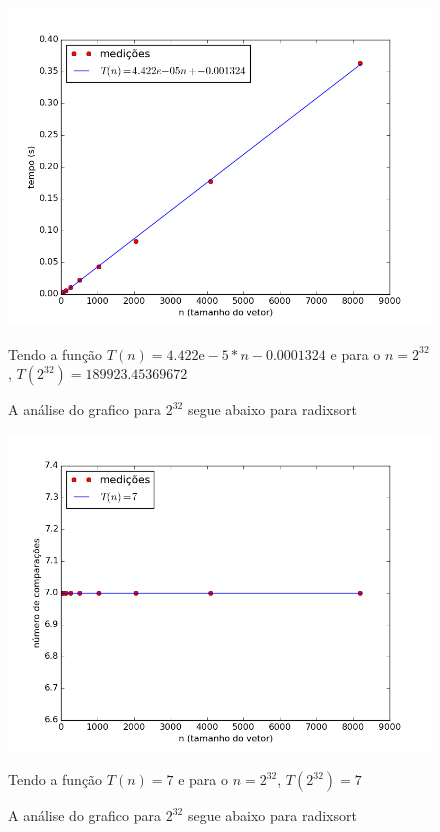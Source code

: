 \documentclass[12pt,a4paper,twoside]{report}
\begin{document}


\begin{figure}[ht]
\centering \includegraphics[scale=0.8]{../radixsort/imagens/radixsortDecrescente0.png}
\caption{A análise do grafico para $2^{32}$ segue abaixo para radixsort}

Tendo a função $T(n) = 4.422\mathrm{e}-5*n-0.0001324$ e para o $n =2^{32}$, $T(2^{32}) = 189923.45369672$
\label{fig:radixsortDecrescente0}
\end{figure}

\begin{figure}[ht]
\centering \includegraphics[scale=0.8]{../radixsort/imagens/radixsortDecrescente1.png}
\caption{A análise do grafico para $2^{32}$ segue abaixo para radixsort}

Tendo a função $T(n) = 7$ e para o $n =2^{32}$, $T(2^{32}) =7$
\label{fig:radixsortDecrescente1}
\end{figure}
\end{document}

